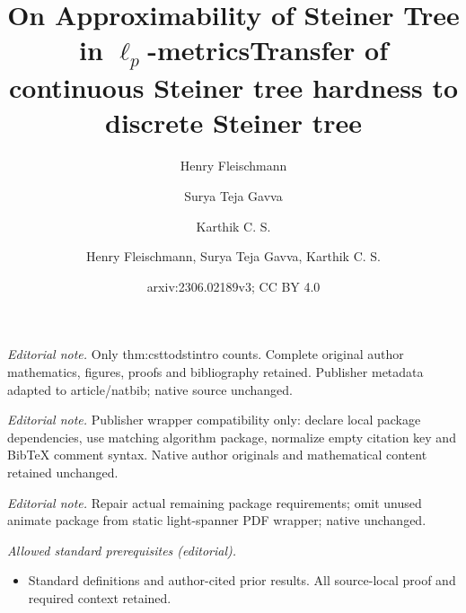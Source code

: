 \documentclass{article}\providecommand{\DeclareRedundantLanguages}[2]{}\usepackage[a4paper,margin=20mm]{geometry}
\title{On Approximability of Steiner Tree in \texorpdfstring{$\ell_p$}{lp}-metrics}
\author{Henry Fleischmann \and Surya Teja Gavva \and Karthik C. S.}\date{}
\title{Transfer of continuous Steiner tree hardness to discrete Steiner tree}
\author{Henry Fleischmann, Surya Teja Gavva, Karthik C. S.}
\date{arxiv:2306.02189v3; CC BY 4.0}
\newcommand{\1}{\textbf{1}}
\begin{document}
\maketitle
\noindent\textit{Editorial note.} Only thm:csttodstintro counts. Complete original author mathematics, figures, proofs and bibliography retained. Publisher metadata adapted to article/natbib; native source unchanged.\par\medskip
\noindent\textit{Editorial note.} Publisher wrapper compatibility only: declare local package dependencies, use matching algorithm package, normalize empty citation key and BibTeX comment syntax. Native author originals and mathematical content retained unchanged.\par\medskip
\noindent\textit{Editorial note.} Repair actual remaining package requirements; omit unused animate package from static light-spanner PDF wrapper; native unchanged.\par\medskip
\noindent\textit{Allowed standard prerequisites (editorial).}\begin{itemize}
\item Standard definitions and author-cited prior results. All source-local proof and required context retained.
\end{itemize}\medskip
\maketitle
\end{document}
